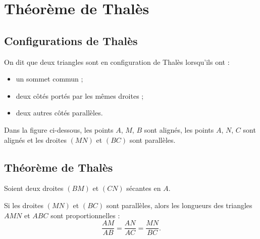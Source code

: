 \documentclass[a4paper,10pt]{report}
\begin{document}
\newpage
\setcounter{chapter}{1}
\chapter{Théorème de Thalès}

\section{Configurations de Thalès}

\begin{defn}
On dit que deux triangles sont en configuration de Thalès lorsqu'ils ont :
\begin{itemize}
\item un sommet commun ;
\item deux côtés portés par les mêmes droites ;
\item deux autres côtés parallèles.
\end{itemize}
\end{defn}

\begin{ex}
Dans la figure ci-dessous, les points $A$, $M$, $B$ sont alignés, les points $A$, $N$, $C$ sont alignés et les droites $(MN)$ et $(BC)$ sont parallèles.

\begin{center}
\end{center}
\end{ex}

\section{Théorème de Thalès}

\begin{thm}
Soient deux droites $(BM)$ et $(CN)$ sécantes en $A$.

Si les droites $(MN)$ et $(BC)$ sont parallèles, alors les longueurs des triangles $AMN$ et $ABC$ sont proportionnelles :
\[
\dfrac{AM}{AB}=\dfrac{AN}{AC}=\dfrac{MN}{BC}.
\]
\end{thm}
\end{document}
